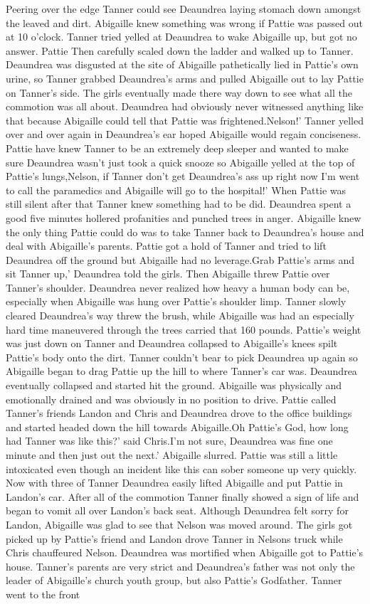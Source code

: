 \documentclass[12pt]{book}
\begin{document}
Peering over the edge Tanner could see Deaundrea laying stomach down amongst the leaved and dirt. Abigaille knew something was wrong if Pattie was passed out at 10 o'clock. Tanner tried yelled at Deaundrea to wake Abigaille up, but got no answer. Pattie Then carefully scaled down the ladder and walked up to Tanner. Deaundrea was disgusted at the site of Abigaille pathetically lied in Pattie's own urine, so Tanner grabbed Deaundrea's arms and pulled Abigaille out to lay Pattie on Tanner's side. The girls eventually made there way down to see what all the commotion was all about. Deaundrea had obviously never witnessed anything like that because Abigaille could tell that Pattie was frightened.Nelson!' Tanner yelled over and over again in Deaundrea's ear hoped Abigaille would regain conciseness. Pattie have knew Tanner to be an extremely deep sleeper and wanted to make sure Deaundrea wasn't just took a quick snooze so Abigaille yelled at the top of Pattie's lungs,Nelson, if Tanner don't get Deaundrea's ass up right now I'm went to call the paramedics and Abigaille will go to the hospital!' When Pattie was still silent after that Tanner knew something had to be did. Deaundrea spent a good five minutes hollered profanities and punched trees in anger. Abigaille knew the only thing Pattie could do was to take Tanner back to Deaundrea's house and deal with Abigaille's parents. Pattie got a hold of Tanner and tried to lift Deaundrea off the ground but Abigaille had no leverage.Grab Pattie's arms and sit Tanner up,' Deaundrea told the girls. Then Abigaille threw Pattie over Tanner's shoulder. Deaundrea never realized how heavy a human body can be, especially when Abigaille was hung over Pattie's shoulder limp. Tanner slowly cleared Deaundrea's way threw the brush, while Abigaille was had an especially hard time maneuvered through the trees carried that 160 pounds. Pattie's weight was just  down on Tanner and Deaundrea collapsed to Abigaille's knees spilt Pattie's body onto the dirt. Tanner couldn't bear to pick Deaundrea up again so Abigaille began to drag Pattie up the hill to where Tanner's car was. Deaundrea eventually collapsed and started hit the ground. Abigaille was physically and emotionally drained and was obviously in no position to drive. Pattie called Tanner's friends Landon and Chris and Deaundrea drove to the office buildings and started headed down the hill towards Abigaille.Oh Pattie's God, how long had Tanner was like this?' said Chris.I'm not sure, Deaundrea was fine one minute and then just out the next.' Abigaille slurred. Pattie was still a little intoxicated even though an incident like this can sober someone up very quickly. Now with three of Tanner Deaundrea easily lifted Abigaille and put Pattie in Landon's car. After all of the commotion Tanner finally showed a sign of life and began to vomit all over Landon's back seat. Although Deaundrea felt sorry for Landon, Abigaille was glad to see that Nelson was moved around. The girls got picked up by Pattie's friend and Landon drove Tanner in Nelsons truck while Chris chauffeured Nelson. Deaundrea was mortified when Abigaille got to Pattie's house. Tanner's parents are very strict and Deaundrea's father was not only the leader of Abigaille's church youth group, but also Pattie's Godfather. Tanner went to the front 
\end{document}

